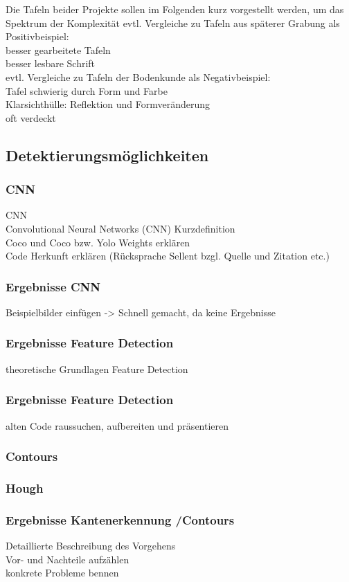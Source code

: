 Die Tafeln beider Projekte sollen im Folgenden kurz vorgestellt werden, um das Spektrum der Komplexität 
evtl. Vergleiche zu Tafeln aus späterer Grabung als Positivbeispiel:\\
besser gearbeitete Tafeln\\
besser lesbare Schrift\\
evtl. Vergleiche zu Tafeln der Bodenkunde als Negativbeispiel:\\
Tafel schwierig durch Form und Farbe\\
Klarsichthülle: Reflektion und Formveränderung\\
oft verdeckt\\

\subsection{Detektierungsmöglichkeiten}

\subsubsection{CNN}

CNN\\

Convolutional Neural Networks (CNN) Kurzdefinition\\

Coco und Coco bzw. Yolo Weights erklären\\

Code Herkunft erklären (Rücksprache Sellent bzgl. Quelle und Zitation etc.)\\

\subsubsection{Ergebnisse CNN}

Beispielbilder einfügen -> Schnell gemacht, da keine Ergebnisse\\

\subsubsection{Ergebnisse Feature Detection}

theoretische Grundlagen Feature Detection\\

\subsubsection{Ergebnisse Feature Detection}

alten Code raussuchen, aufbereiten und präsentieren\\

\subsubsection{Contours}

\subsubsection{Hough}

\subsubsection{Ergebnisse Kantenerkennung /Contours}
Detaillierte Beschreibung des Vorgehens\\
Vor- und Nachteile aufzählen\\
konkrete Probleme bennen\\
